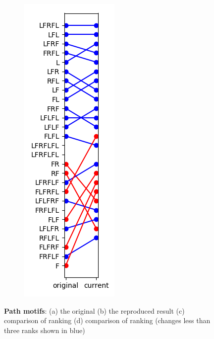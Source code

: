 \documentclass{article}
\begin{document}
\begin{figure}[!htp]
{\begin{subfigure}[b]{0.15\textwidth}
            \caption{}
            \label{fig:path2}
        \end{subfigure}
        \begin{subfigure}[b]{0.15\textwidth}
            \centering
            \includegraphics[width=\textwidth]{path-3}
            \caption{}
            \label{fig:path3}
        \end{subfigure}
    }
    \caption{\textbf{Path motifs}: (a) the original (b) the reproduced result (c) comparison of ranking (d) comparison of ranking (changes less than three ranks shown in blue)}
    \label{fig:fig3}
\end{figure}
\end{document}

